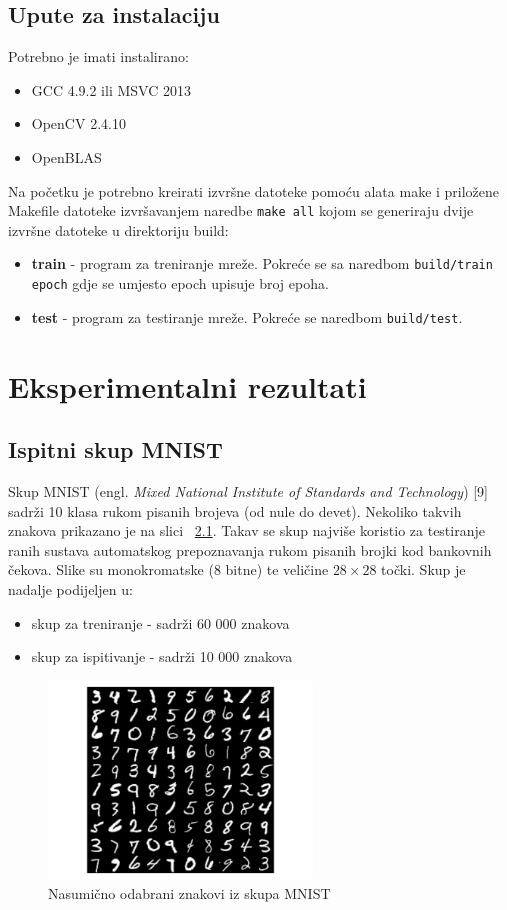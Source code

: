 \documentclass[times, utf8, zavrsni, numeric]{fer}
\begin{document}
\section{Upute za instalaciju}
Potrebno je imati instalirano:
\begin{itemize}
\item GCC 4.9.2 ili MSVC 2013
\item OpenCV 2.4.10
\item OpenBLAS
\end{itemize}

Na početku je potrebno kreirati izvršne datoteke pomoću alata make i priložene Makefile datoteke izvršavanjem naredbe {\tt make all} kojom se generiraju dvije izvršne datoteke u direktoriju build:
\begin{itemize}
\item \textbf{train} - program za treniranje mreže. Pokreće se sa naredbom {\tt build/train epoch} gdje se umjesto epoch upisuje broj epoha. 
\item \textbf{test} - program za testiranje mreže. Pokreće se naredbom {\tt build/test}.
\end{itemize}

\chapter{Eksperimentalni rezultati}

\section{Ispitni skup MNIST}
Skup MNIST (engl. \textit{Mixed National Institute of Standards and Technology}) [9] sadrži
10 klasa rukom pisanih brojeva (od nule do devet). Nekoliko takvih znakova prikazano
je na slici ~\ref{fig:MNIST}. Takav se skup najviše koristio za testiranje ranih sustava automatskog
prepoznavanja rukom pisanih brojki kod bankovnih čekova. Slike su monokromatske
(8 bitne) te veličine $28 \times 28$ točki. Skup je nadalje podijeljen u:
\begin{itemize}
\item skup za treniranje - sadrži 60 000 znakova
\item skup za ispitivanje - sadrži 10 000 znakova
\end{itemize}

\begin{figure}
    \centering
    \includegraphics[width=7cm]{img/mnist-digits.png}
    \caption{Nasumično odabrani znakovi iz skupa MNIST}
    \label{fig:MNIST}
\end{figure}
\end{document}
